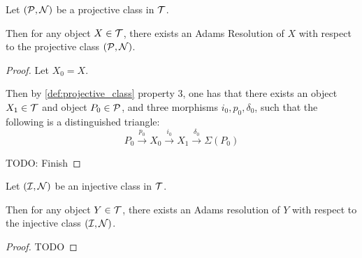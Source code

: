 \begin{theorem} %
    Let \( ({\mathcal{P}}, {\mathcal{N}}) \) be a projective class in \( {\mathcal{T}} \).

    Then for any object \( X \in {\mathcal{T}} \), there exists an Adams Resolution of \( X \) with respect to the projective class \( ({\mathcal{P}}, {\mathcal{N}}) \).
\end{theorem}
\begin{proof}
    Let \( X_0 = X \).

    Then by \autoref{def:projective_class} property 3, one has that there exists an object \( X_1 \in {\mathcal{T}} \) and object \( P_0 \in {\mathcal{P}} \), and three morphisms \( i_0, p_0, \delta_0 \), such that the following is a distinguished triangle:
    \[
        P_0 \stackrel{p_0}{\longrightarrow} X_0 \stackrel{i_0}{\longrightarrow} X_1 \stackrel{\delta_0}{\longrightarrow} \Sigma(P_0)
    \]

    TODO: Finish
\end{proof}

\begin{theorem} \label{thm:exists_adams_resolution_injective_class} %
    Let \( ({\mathcal{I}}, {\mathcal{N}}) \) be an injective class in \( {\mathcal{T}} \).

    Then for any object \( Y \in {\mathcal{T}} \), there exists an Adams resolution of \( Y \) with respect to the injective class \( ({\mathcal{I}}, {\mathcal{N}}) \).
\end{theorem}
\begin{proof}
    TODO
\end{proof}


